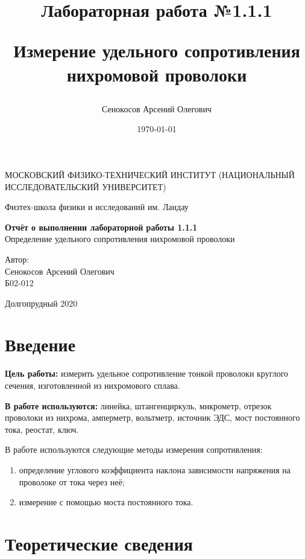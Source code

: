 \documentclass[a4paper,12pt]{article} %
\author{Сенокосов Арсений Олегович}
\title{Лабораторная работа №1.1.1

Измерение удельного сопротивления нихромовой проволоки
}
\date{\today}
\begin{document}
\begin{titlepage}
	\begin{center}
		{\large МОСКОВСКИЙ ФИЗИКО-ТЕХНИЧЕСКИЙ ИНСТИТУТ (НАЦИОНАЛЬНЫЙ ИССЛЕДОВАТЕЛЬСКИЙ УНИВЕРСИТЕТ)}
	\end{center}
	\begin{center}
		{\large Физтех-школа физики и исследований им. Ландау}
	\end{center}
	
	
	\vspace{4.5cm}
	{\huge
		\begin{center}
			{\bf Отчёт о выполнении лабораторной работы 1.1.1}\\
			Определение удельного сопротивления нихромовой проволоки
		\end{center}
	}
	\vspace{2cm}
	\begin{flushright}
		{\LARGE Автор:\\ Сенокосов Арсений Олегович \\
			\vspace{0.2cm}
			Б02-012}
	\end{flushright}
	\vspace{8cm}
	\begin{center}
		Долгопрудный 2020
	\end{center}
\end{titlepage}

\section{Введение}

\textbf{Цель работы:} измерить удельное сопротивление тонкой проволоки круглого сечения, изготовленной из нихромового сплава.
\medskip

\textbf{В работе используются:} линейка, штангенциркуль, микрометр, отрезок проволоки из нихрома, амперметр, вольтметр, источник ЭДС, мост постоянного тока, реостат, ключ.
\medskip

В работе используются следующие методы измерения сопротивления:
\begin{enumerate}
	\item определение углового коэффициента наклона зависимости напряжения на проволоке от тока через неё;
	\item измерение с помощью моста постоянного тока.
\end{enumerate}

\section{Теоретические сведения}
\end{document}
